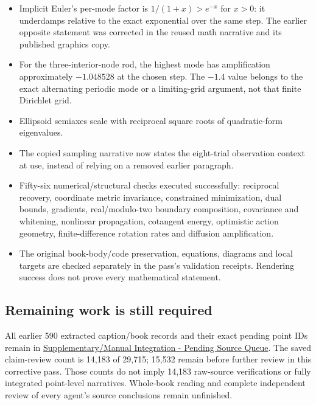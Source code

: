 \begin{itemize}
\tightlist
\item
  Implicit Euler's per-mode factor is \(1/(1+x)>e^{-x}\) for \(x>0\): it underdamps relative to the exact exponential over the same step. The earlier opposite statement was corrected in the reused math narrative and its published graphics copy.
\item
  For the three-interior-node rod, the highest mode has amplification approximately \(-1.048528\) at the chosen step. The \(-1.4\) value belongs to the exact alternating periodic mode or a limiting-grid argument, not that finite Dirichlet grid.
\item
  Ellipsoid semiaxes scale with reciprocal square roots of quadratic-form eigenvalues.
\item
  The copied sampling narrative now states the eight-trial observation context at use, instead of relying on a removed earlier paragraph.
\item
  Fifty-six numerical/structural checks executed successfully: reciprocal recovery, coordinate metric invariance, constrained minimization, dual bounds, gradients, real/modulo-two boundary composition, covariance and whitening, nonlinear propagation, cotangent energy, optimistic action geometry, finite-difference rotation rates and diffusion amplification.
\item
  The original book-body/code preservation, equations, diagrams and local targets are checked separately in the pass's validation receipts. Rendering success does not prove every mathematical statement.
\end{itemize}

\subsection{Remaining work is still required}\label{appendix-5056f3debc1f-remaining-work-is-still-required}

\hypertarget{appendix-5056f3debc1f-remaining-work-is-still-required}{}

All earlier 590 extracted caption/book records and their exact pending point IDs remain in \hyperref[appendix-ac1f51db5e9a]{Supplementary/Manual Integration - Pending Source Queue}. The saved claim-review count is 14,183 of 29,715; 15,532 remain before further review in this corrective pass. Those counts do not imply 14,183 raw-source verifications or fully integrated point-level narratives. Whole-book reading and complete independent review of every agent's source conclusions remain unfinished.

